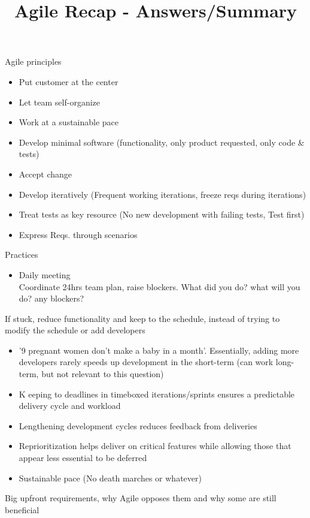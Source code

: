 \documentclass[10pt]{article}
\title{Agile Recap - Answers/Summary}
\date{}
\author{}
\begin{document}
\maketitle
Agile principles
\begin{itemize}
\item Put customer at the center
\item Let team self-organize
\item Work at a sustainable pace
\item Develop minimal software (functionality, only product requested, only code \& tests)
\item Accept change
\end{itemize}
\begin{itemize}
\item Develop iteratively (Frequent working iterations, freeze reqs during iterations)
\item Treat tests as key resource (No new development with failing tests, Test first)
\item Express Reqs. through scenarios
\end{itemize}
Practices
\begin{itemize}
\item Daily meeting\\
Coordinate 24hrs team plan, raise blockers. What did you do? what will you do? any blockers?
\end{itemize}
If stuck, reduce functionality and keep to the schedule, instead of trying to modify the schedule or add developers
\begin{itemize}
\item '9 pregnant women don't make a baby in a month'. Essentially, adding more developers rarely speeds up development in the short-term (can work long-term, but not relevant to this question)
\item K eeping to deadlines in timeboxed iterations/sprints ensures a predictable delivery cycle and workload
\item Lengthening development cycles reduces feedback from deliveries
\item Reprioritization helps deliver on critical features while allowing those that appear less essential to be deferred
\item Sustainable pace (No death marches or whatever)
\end{itemize}
Big upfront requirements, why Agile opposes them and why some are still beneficial
\end{document}
